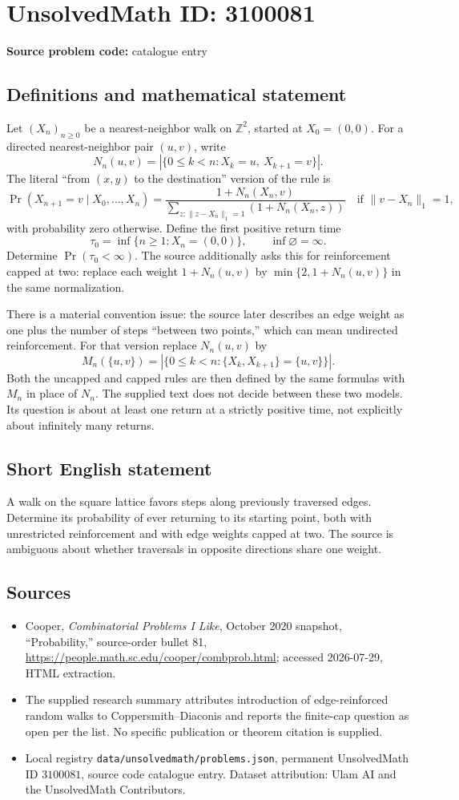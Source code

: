 \documentclass[11pt]{article}
\begin{document}
\section*{UnsolvedMath ID: 3100081}
\textbf{Source problem code:} catalogue entry
\subsection{Definitions and mathematical statement}
Let $(X_n)_{n\geq0}$ be a nearest-neighbor walk on $\mathbb Z^2$, started at $X_0=(0,0)$. For a directed nearest-neighbor pair $(u,v)$, write
\[
N_n(u,v)=|\{0\leq k<n:X_k=u,\ X_{k+1}=v\}|.
\]
The literal ``from $(x,y)$ to the destination'' version of the rule is
\[
\Pr(X_{n+1}=v\mid X_0,\ldots,X_n)
=\frac{1+N_n(X_n,v)}{\sum_{z:\|z-X_n\|_1=1}(1+N_n(X_n,z))}
\quad\text{if }\|v-X_n\|_1=1,
\]
with probability zero otherwise. Define the first positive return time
\[
\tau_0=\inf\{n\geq1:X_n=(0,0)\},\qquad\inf\varnothing=\infty.
\]
Determine $\Pr(\tau_0<\infty)$. The source additionally asks this for reinforcement capped at two: replace each weight $1+N_n(u,v)$ by $\min\{2,1+N_n(u,v)\}$ in the same normalization.

There is a material convention issue: the source later describes an edge weight as one plus the number of steps ``between two points,'' which can mean undirected reinforcement. For that version replace $N_n(u,v)$ by
\[
M_n(\{u,v\})=|\{0\leq k<n:\{X_k,X_{k+1}\}=\{u,v\}\}|.
\]
Both the uncapped and capped rules are then defined by the same formulas with $M_n$ in place of $N_n$. The supplied text does not decide between these two models. Its question is about at least one return at a strictly positive time, not explicitly about infinitely many returns.
\subsection{Short English statement}
A walk on the square lattice favors steps along previously traversed edges. Determine its probability of ever returning to its starting point, both with unrestricted reinforcement and with edge weights capped at two. The source is ambiguous about whether traversals in opposite directions share one weight.
\subsection{Sources}
\begin{itemize}
\item Cooper, \emph{Combinatorial Problems I Like}, October 2020 snapshot, ``Probability,'' source-order bullet 81, \url{https://people.math.sc.edu/cooper/combprob.html}; accessed 2026-07-29, HTML extraction.
\item The supplied research summary attributes introduction of edge-reinforced random walks to Coppersmith--Diaconis and reports the finite-cap question as open per the list. No specific publication or theorem citation is supplied.
\item Local registry \texttt{data/unsolvedmath/problems.json}, permanent UnsolvedMath ID $3100081$, source code catalogue entry. Dataset attribution: Ulam AI and the UnsolvedMath Contributors.
\end{itemize}
\end{document}
